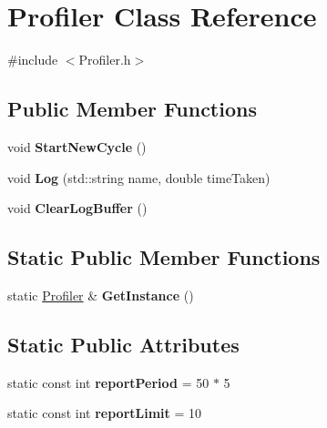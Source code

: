 \hypertarget{class_profiler}{\section{\-Profiler \-Class \-Reference}
\label{class_profiler}
}


{\ttfamily \#include $<$\-Profiler.\-h$>$}

\subsection*{\-Public \-Member \-Functions}
\begin{DoxyCompactItemize}
\item 
\hypertarget{class_profiler_a5953010288cfb36c95e84f0370411cbc}{void {\bfseries \-Start\-New\-Cycle} ()}\label{class_profiler_a5953010288cfb36c95e84f0370411cbc}

\item 
\hypertarget{class_profiler_a9baecdda5cc00bd43d6196105d34ce32}{void {\bfseries \-Log} (std\-::string name, double time\-Taken)}\label{class_profiler_a9baecdda5cc00bd43d6196105d34ce32}

\item 
\hypertarget{class_profiler_afea0a7425697009c14fb240ada89a37b}{void {\bfseries \-Clear\-Log\-Buffer} ()}\label{class_profiler_afea0a7425697009c14fb240ada89a37b}

\end{DoxyCompactItemize}
\subsection*{\-Static \-Public \-Member \-Functions}
\begin{DoxyCompactItemize}
\item 
\hypertarget{class_profiler_a97ff2f7bcb63ca90750389049f7038a3}{static \hyperlink{class_profiler}{\-Profiler} \& {\bfseries \-Get\-Instance} ()}\label{class_profiler_a97ff2f7bcb63ca90750389049f7038a3}

\end{DoxyCompactItemize}
\subsection*{\-Static \-Public \-Attributes}
\begin{DoxyCompactItemize}
\item 
\hypertarget{class_profiler_a7c1def2ecb10a5400799769ae2c5b6eb}{static const int {\bfseries report\-Period} = 50 $\ast$ 5}\label{class_profiler_a7c1def2ecb10a5400799769ae2c5b6eb}

\item 
\hypertarget{class_profiler_a28a468656e52f8bbeaf2a76c07ecdac2}{static const int {\bfseries report\-Limit} = 10}\label{class_profiler_a28a468656e52f8bbeaf2a76c07ecdac2}

\end{DoxyCompactItemize}
